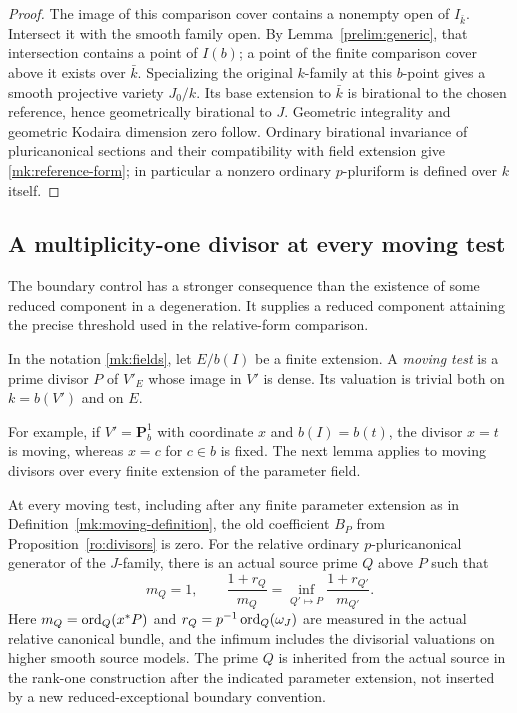 \begin{proof}
The image of this comparison cover contains a nonempty open of
$I_{\bar k}$. Intersect it with the smooth family open. By
Lemma~\ref{prelim:generic}, that intersection contains a point of
$I(b)$; a point of the finite comparison cover above it exists over
$\bar k$. Specializing the original $k$-family at this $b$-point
gives a smooth projective variety $J_0/k$. Its base extension to
$\bar k$ is birational to the chosen reference, hence geometrically
birational to $J$. Geometric
integrality and geometric Kodaira dimension zero follow.  Ordinary
birational invariance of pluricanonical sections and their compatibility
with field extension give \eqref{mk:reference-form}; in particular a
nonzero ordinary $p$-pluriform is defined over $k$ itself.
\end{proof}

\subsection{A multiplicity-one divisor at every moving test}

The boundary control has a stronger consequence than the existence of
some reduced component in a degeneration.  It supplies a reduced
component attaining the precise threshold used in the relative-form
comparison.

\begin{definition}\label{mk:moving-definition}
In the notation \eqref{mk:fields}, let $E/b(I)$ be a finite extension.
A \emph{moving test} is a prime divisor $P$ of $V'_E$ whose image in
$V'$ is dense.  Its valuation is trivial both on $k=b(V')$ and on $E$.
\end{definition}

For example, if $V'=\mathbf P^1_b$ with coordinate $x$ and
$b(I)=b(t)$, the divisor $x=t$ is moving, whereas $x=c$ for
$c\in b$ is fixed. The next lemma applies to moving divisors over
every finite extension of the parameter field.

\begin{lemma}\label{mk:moving}
At every moving test, including after any finite parameter extension
as in Definition~\ref{mk:moving-definition}, the old coefficient $B_P$
from Proposition~\ref{ro:divisors} is zero.  For the relative ordinary
$p$-pluricanonical generator of the $J$-family, there is an actual source
prime $Q$ above $P$ such that
\begin{equation}\label{mk:threshold-minimizer}
 m_Q=1,
 \qquad
 \frac{1+r_Q}{m_Q}
 =\inf_{Q'\mapsto P}\frac{1+r_{Q'}}{m_{Q'}}.
\end{equation}
Here $m_Q=\operatorname{ord}_Q(x^*P)$ and
$r_Q=p^{-1}\operatorname{ord}_Q(\omega_J)$ are measured in the actual relative
canonical bundle, and the infimum includes the divisorial valuations
on higher smooth source models.  The prime $Q$ is inherited from the
actual source in the rank-one construction after the indicated
parameter extension, not inserted by a new reduced-exceptional
boundary convention.
\end{lemma}


